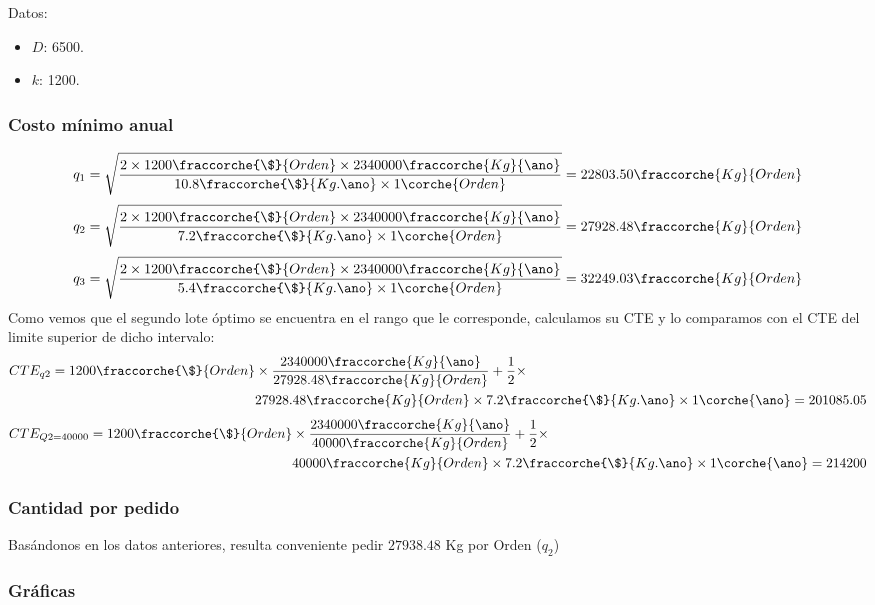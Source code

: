 \begin{homeworkProblem}
Datos:
\begin{itemize}
    \item $D$: 6500.
    \item $k$: 1200.
\end{itemize}
\subsubsection{Costo mínimo anual}
\begin{align*}
    q_1=\sqrt{
        \frac{
            2\times 1200\fraccorche{\$}{Orden}\times 2340000\fraccorche{Kg}{\ano}
            }{
                10.8\fraccorche{\$}{Kg.\ano}\times 1\corche{Orden}
            }
        }
        =
        22803.50\fraccorche{Kg}{Orden}
\end{align*}
\begin{align*}
    q_2=\sqrt{
        \frac{
            2\times 1200\fraccorche{\$}{Orden}\times 2340000\fraccorche{Kg}{\ano}
            }{
                7.2\fraccorche{\$}{Kg.\ano}\times 1\corche{Orden}
            }
        }
        =
        27928.48\fraccorche{Kg}{Orden}
\end{align*}
\begin{align*}
    q_3=\sqrt{
        \frac{
            2\times 1200\fraccorche{\$}{Orden}\times 2340000\fraccorche{Kg}{\ano}
            }{
                5.4\fraccorche{\$}{Kg.\ano}\times 1\corche{Orden}
            }
        }
        =
        32249.03\fraccorche{Kg}{Orden}
\end{align*}
Como vemos que el segundo lote óptimo se encuentra en el rango que le corresponde, calculamos su CTE y lo comparamos con el CTE del limite superior de dicho intervalo:
\begin{align*}
    CTE_{q2} = 1200\fraccorche{\$}{Orden}&\times \frac{2340000\fraccorche{Kg}{\ano}}{27928.48\fraccorche{Kg}{Orden}}  + \frac{1}{2}\times \\ & 27928.48\fraccorche{Kg}{Orden}\times 7.2\fraccorche{\$}{Kg.\ano}\times 1\corche{\ano}=201085.05
\end{align*}
\begin{align*}
    CTE_{Q2=40000} = 1200\fraccorche{\$}{Orden}&\times \frac{2340000\fraccorche{Kg}{\ano}}{40000\fraccorche{Kg}{Orden}}  + \frac{1}{2}\times \\ & 40000\fraccorche{Kg}{Orden}\times 7.2\fraccorche{\$}{Kg.\ano}\times 1\corche{\ano}=214200
\end{align*}

\subsubsection{Cantidad por pedido}
Basándonos en los datos anteriores, resulta conveniente pedir $27938.48$ Kg por Orden ($q_2$)

\subsubsection{Gráficas}
\end{homeworkProblem}